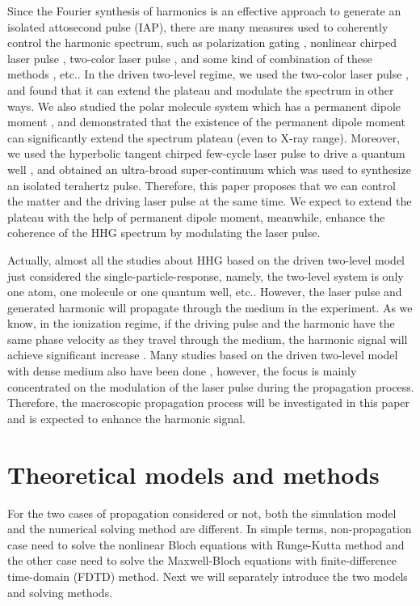 \documentclass[10pt,letterpaper]{article}
\begin{document}
Since the Fourier synthesis of harmonics is an effective approach to generate an isolated attosecond pulse (IAP), there are many measures used to coherently control the harmonic spectrum, such as polarization gating \cite{Corkum-PRL-1993,Sansone-Polarization-gate-Nature-2006}, nonlinear chirped laser pulse \cite{Carrera-Chirp-PRA-2007}, two-color laser pulse \cite{ZengZhinan-Two-Color-PRL-2007}, and some kind of combination of these methods \cite{ChangZenghu-Combination-PRA-2007}, etc.. In the driven two-level regime, we used the two-color laser pulse \cite{Gong-Two-Level-Two-Color-JMO-1999,WANG-ZHONG-YANG-Two-Level-Attosecond-generation-1999,LiuChengpu-Two-Level-PRA-2004}, and found that it can extend the plateau and modulate the spectrum in other ways. We also studied the polar molecule system which has a permanent dipole moment \cite{YangWeifeng-Two-Level-PLA-2007}, and demonstrated that the existence of the permanent dipole moment can significantly extend the spectrum plateau (even to X-ray range). Moreover, we used the hyperbolic tangent chirped few-cycle laser pulse to drive a quantum well \cite{CuiNi2010NJP-wavelet}, and obtained an ultra-broad super-continuum which was used to synthesize an isolated terahertz pulse. Therefore, this paper proposes that we can control the matter and the driving laser pulse at the same time. We expect to extend the plateau with the help of permanent dipole moment, meanwhile, enhance the coherence of the HHG spectrum by  modulating the laser pulse. 

Actually, almost all the studies about HHG based on the driven two-level model just considered the single-particle-response, namely, the two-level system is only one atom, one molecule or one quantum well, etc.. However, the laser pulse and generated harmonic will propagate through the medium in the experiment. As we know, in the ionization regime, if the driving pulse and the harmonic have the same phase velocity as they travel through the medium, the harmonic signal will achieve significant increase \cite{2009Review}. Many studies based on the driven two-level model with dense medium also have been done \cite{Kalosha-Two-Level-PRL-1999,Xiao-Jian-PRA-2002,Xia-Keyu-OE-2005,Pan-Ruiqin-Permanent-dipole-moment-2011,Ziolkowski-Two-Level-Method-PRA-1995}, however, the focus is mainly concentrated on the modulation of the laser pulse during the propagation process. Therefore, the macroscopic propagation process will be investigated in this paper and is expected to enhance the harmonic signal.

\section{Theoretical models and methods}
For the two cases of propagation considered or not, both the simulation model and the numerical solving method are different. In simple terms, non-propagation case need to solve the nonlinear Bloch equations with Runge-Kutta method and the other case need to solve the Maxwell-Bloch equations with finite-difference time-domain (FDTD) method. Next we will separately introduce the two models and solving methods. 
\end{document}

